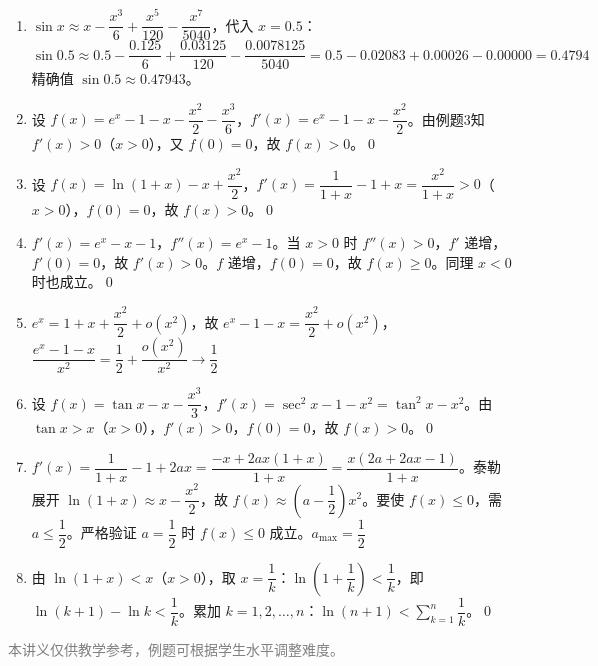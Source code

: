 \documentclass[12pt, a4paper]{ctexart}
\begin{document}
\vspace{20pt}

\begin{knowledgebox}[参考答案]
\begin{enumerate}[leftmargin=2em]
  \item $\sin x \approx x - \dfrac{x^3}{6} + \dfrac{x^5}{120} - \dfrac{x^7}{5040}$，代入 $x = 0.5$：
  \[
  \sin 0.5 \approx 0.5 - \frac{0.125}{6} + \frac{0.03125}{120} - \frac{0.0078125}{5040} = 0.5 - 0.02083 + 0.00026 - 0.00000 = \boxed{0.4794}
  \]
  精确值 $\sin 0.5 \approx 0.47943$。

  \item 设 $f(x) = e^x - 1 - x - \dfrac{x^2}{2} - \dfrac{x^3}{6}$，$f'(x) = e^x - 1 - x - \dfrac{x^2}{2}$。由例题3知 $f'(x) > 0$（$x > 0$），又 $f(0) = 0$，故 $f(x) > 0$。\qed

  \item 设 $f(x) = \ln(1+x) - x + \dfrac{x^2}{2}$，$f'(x) = \dfrac{1}{1+x} - 1 + x = \dfrac{x^2}{1+x} > 0$（$x > 0$），$f(0) = 0$，故 $f(x) > 0$。\qed

  \item $f'(x) = e^x - x - 1$，$f''(x) = e^x - 1$。当 $x > 0$ 时 $f''(x) > 0$，$f'$ 递增，$f'(0) = 0$，故 $f'(x) > 0$。$f$ 递增，$f(0) = 0$，故 $f(x) \geq 0$。同理 $x < 0$ 时也成立。\qed

  \item $e^x = 1 + x + \dfrac{x^2}{2} + o(x^2)$，故 $e^x - 1 - x = \dfrac{x^2}{2} + o(x^2)$，$\dfrac{e^x - 1 - x}{x^2} = \dfrac{1}{2} + \dfrac{o(x^2)}{x^2} \to \boxed{\dfrac{1}{2}}$

  \item 设 $f(x) = \tan x - x - \dfrac{x^3}{3}$，$f'(x) = \sec^2 x - 1 - x^2 = \tan^2 x - x^2$。由 $\tan x > x$（$x > 0$），$f'(x) > 0$，$f(0) = 0$，故 $f(x) > 0$。\qed

  \item $f'(x) = \dfrac{1}{1+x} - 1 + 2ax = \dfrac{-x + 2ax(1+x)}{1+x} = \dfrac{x(2a + 2ax - 1)}{1+x}$。泰勒展开 $\ln(1+x) \approx x - \dfrac{x^2}{2}$，故 $f(x) \approx \left(a - \dfrac{1}{2}\right)x^2$。要使 $f(x) \leq 0$，需 $a \leq \dfrac{1}{2}$。严格验证 $a = \dfrac{1}{2}$ 时 $f(x) \leq 0$ 成立。$\boxed{a_{\max} = \dfrac{1}{2}}$

  \item 由 $\ln(1+x) < x$（$x > 0$），取 $x = \dfrac{1}{k}$：$\ln\left(1 + \dfrac{1}{k}\right) < \dfrac{1}{k}$，即 $\ln(k+1) - \ln k < \dfrac{1}{k}$。累加 $k = 1, 2, \ldots, n$：$\ln(n+1) < \displaystyle\sum_{k=1}^{n} \dfrac{1}{k}$。\qed
\end{enumerate}
\end{knowledgebox}

\vfill
\begin{center}
\small\textcolor{gray}{本讲义仅供教学参考，例题可根据学生水平调整难度。}
\end{center}
\end{document}
